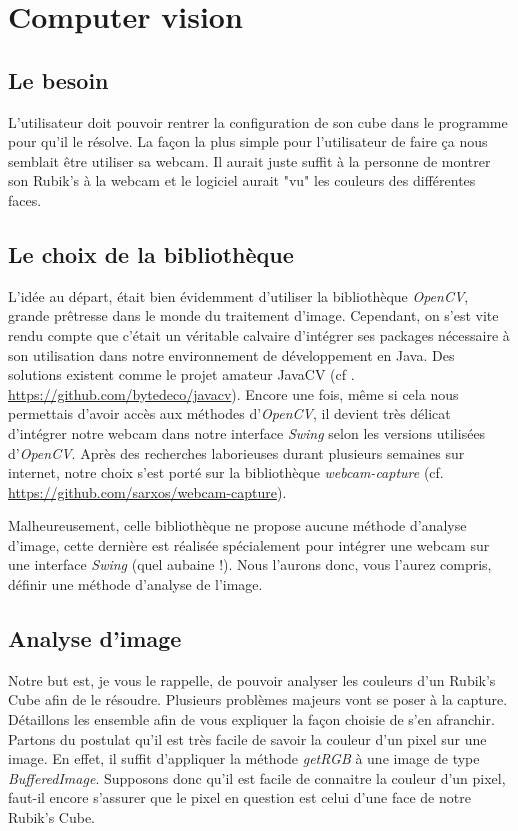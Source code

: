 \chapter{Computer vision}

\section{Le besoin}
L'utilisateur doit pouvoir rentrer la configuration de son cube dans le programme pour qu'il le résolve.
La façon la plus simple pour l'utilisateur de faire ça nous semblait être utiliser sa webcam.
Il aurait juste suffit à la personne de montrer son Rubik's à la webcam et le logiciel aurait "vu" les couleurs des différentes faces.

\section{Le choix de la bibliothèque}
L'idée au départ, était bien évidemment d'utiliser la bibliothèque \textit{OpenCV}, grande prêtresse dans le monde du traitement d'image.
Cependant, on s'est vite rendu compte que c'était un véritable calvaire d'intégrer ses packages nécessaire à son utilisation dans notre 
environnement de développement en Java. Des solutions existent comme le projet amateur JavaCV (cf . \url{https://github.com/bytedeco/javacv}).
Encore une fois, même si cela nous permettais d'avoir accès aux méthodes d'\textit{OpenCV}, il devient très délicat d'intégrer notre webcam
dans notre interface \textit{Swing} selon les versions utilisées d'\textit{OpenCV}. Après des recherches laborieuses durant plusieurs semaines 
sur internet, notre choix s'est porté sur la bibliothèque \textit{webcam-capture} (cf. \url{https://github.com/sarxos/webcam-capture}).

Malheureusement, celle bibliothèque ne propose aucune méthode d'analyse d'image, cette dernière est réalisée spécialement pour intégrer une webcam
sur une interface \textit{Swing} (quel aubaine !). Nous l'aurons donc, vous l'aurez compris, définir une méthode d'analyse de l'image.

\section{Analyse d'image}
Notre but est, je vous le rappelle, de pouvoir analyser les couleurs d'un Rubik's Cube afin de le résoudre. Plusieurs problèmes majeurs vont se poser à la capture.
Détaillons les ensemble afin de vous expliquer la façon choisie de s'en afranchir.
Partons du postulat qu'il est très facile de savoir la couleur d'un pixel sur une image.
En effet, il suffit d'appliquer la méthode \textit{getRGB} à une image de type \textit{BufferedImage}.
Supposons donc qu'il est facile de connaitre la couleur d'un pixel, faut-il encore s'assurer que le pixel en question est celui d'une face de notre Rubik's Cube.

